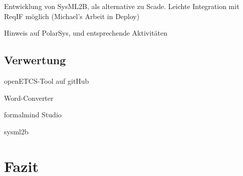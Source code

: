 \documentclass[twoside]{article}
\begin{document}
\begin{multicols}{2}
Entwicklung von SysML2B, als alternative zu Scade.  Leichte Integration mit ReqIF möglich (Michael's Arbeit in Deploy)

Hinweis auf PolarSys, und entsprechende Aktivitäten

\subsection{Verwertung}

openETCS-Tool auf gitHub

Word-Converter

formalmind Studio

sysml2b

\section{Fazit}


\end{multicols}

\titleformat{\section}[block]{\large\scshape\centering{}}{}{1em}{}



\end{document}
